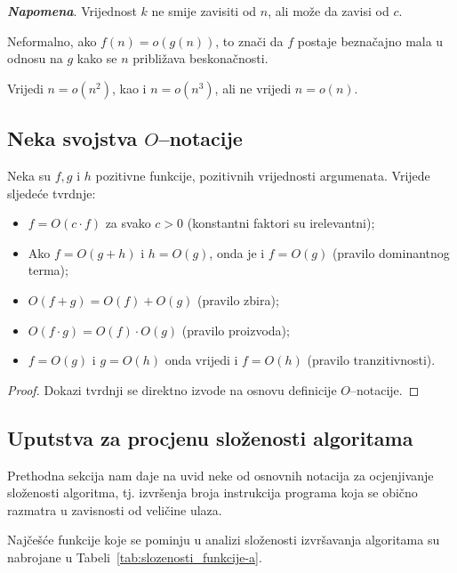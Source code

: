 \noindent \textbf{\textit{Napomena}}. Vrijednost $k$ ne smije zavisiti od $n$, ali može da zavisi od $c$.

Neformalno, ako $f(n) = o(g(n))$, to znači da  $f$ postaje beznačajno mala u odnosu na $g$ kako se $n$ približava beskonačnosti.

\begin{example}
    Vrijedi $n = o(n^2)$, kao i $n = o(n^3)$, ali ne vrijedi $n = o(n)$. 
\end{example}

\subsection{Neka svojstva $O$--notacije}

\begin{theorem} Neka su $f, g$ i $h$ pozitivne funkcije, pozitivnih vrijednosti argumenata.  Vrijede sljedeće tvrdnje:
	\begin{itemize}
		\item 	  $f = O(c \cdot f)$ za svako $c > 0$ (konstantni faktori su irelevantni);
		\item Ako $f = O(g +  h)$ i $h = O(g)$, onda je i $f = O(g)$  (pravilo dominantnog terma);
		\item $O(f + g) = O(f)  + O(g)$ (pravilo zbira);
		\item $O( f \cdot g) = O(f) \cdot O(g)$ (pravilo proizvoda);
        \item $f = O(g)$ i $g = O(h)$ onda
        vrijedi i $f = O(h)$ (pravilo tranzitivnosti). 
	\end{itemize}
 
\end{theorem}

\begin{proof}
	Dokazi tvrdnji se direktno izvode na osnovu definicije $O$--notacije.
\end{proof}

\subsection{Uputstva za procjenu složenosti algoritama}

Prethodna sekcija nam daje na uvid neke od osnovnih notacija za ocjenjivanje složenosti   algoritma, tj. izvršenja broja instrukcija programa koja se obično razmatra u zavisnosti od veličine ulaza. 

 Najčešće funkcije koje se pominju u analizi složenosti izvršavanja algoritama su nabrojane u Tabeli~\ref{tab:slozenosti_funkcije-a}. 
 
